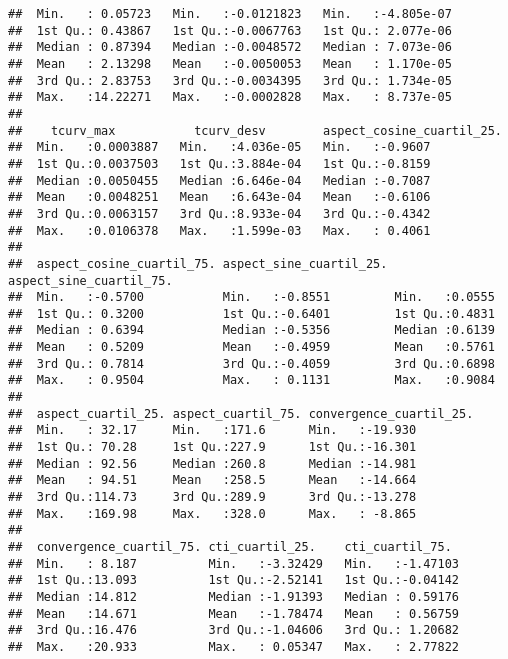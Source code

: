 \documentclass[11pt,]{article}
\begin{document}
\begin{verbatim}
##  Min.   : 0.05723   Min.   :-0.0121823   Min.   :-4.805e-07  
##  1st Qu.: 0.43867   1st Qu.:-0.0067763   1st Qu.: 2.077e-06  
##  Median : 0.87394   Median :-0.0048572   Median : 7.073e-06  
##  Mean   : 2.13298   Mean   :-0.0050053   Mean   : 1.170e-05  
##  3rd Qu.: 2.83753   3rd Qu.:-0.0034395   3rd Qu.: 1.734e-05  
##  Max.   :14.22271   Max.   :-0.0002828   Max.   : 8.737e-05  
##                                                              
##    tcurv_max           tcurv_desv        aspect_cosine_cuartil_25.
##  Min.   :0.0003887   Min.   :4.036e-05   Min.   :-0.9607          
##  1st Qu.:0.0037503   1st Qu.:3.884e-04   1st Qu.:-0.8159          
##  Median :0.0050455   Median :6.646e-04   Median :-0.7087          
##  Mean   :0.0048251   Mean   :6.643e-04   Mean   :-0.6106          
##  3rd Qu.:0.0063157   3rd Qu.:8.933e-04   3rd Qu.:-0.4342          
##  Max.   :0.0106378   Max.   :1.599e-03   Max.   : 0.4061          
##                                                                   
##  aspect_cosine_cuartil_75. aspect_sine_cuartil_25. aspect_sine_cuartil_75.
##  Min.   :-0.5700           Min.   :-0.8551         Min.   :0.0555         
##  1st Qu.: 0.3200           1st Qu.:-0.6401         1st Qu.:0.4831         
##  Median : 0.6394           Median :-0.5356         Median :0.6139         
##  Mean   : 0.5209           Mean   :-0.4959         Mean   :0.5761         
##  3rd Qu.: 0.7814           3rd Qu.:-0.4059         3rd Qu.:0.6898         
##  Max.   : 0.9504           Max.   : 0.1131         Max.   :0.9084         
##                                                                           
##  aspect_cuartil_25. aspect_cuartil_75. convergence_cuartil_25.
##  Min.   : 32.17     Min.   :171.6      Min.   :-19.930        
##  1st Qu.: 70.28     1st Qu.:227.9      1st Qu.:-16.301        
##  Median : 92.56     Median :260.8      Median :-14.981        
##  Mean   : 94.51     Mean   :258.5      Mean   :-14.664        
##  3rd Qu.:114.73     3rd Qu.:289.9      3rd Qu.:-13.278        
##  Max.   :169.98     Max.   :328.0      Max.   : -8.865        
##                                                               
##  convergence_cuartil_75. cti_cuartil_25.    cti_cuartil_75.   
##  Min.   : 8.187          Min.   :-3.32429   Min.   :-1.47103  
##  1st Qu.:13.093          1st Qu.:-2.52141   1st Qu.:-0.04142  
##  Median :14.812          Median :-1.91393   Median : 0.59176  
##  Mean   :14.671          Mean   :-1.78474   Mean   : 0.56759  
##  3rd Qu.:16.476          3rd Qu.:-1.04606   3rd Qu.: 1.20682  
##  Max.   :20.933          Max.   : 0.05347   Max.   : 2.77822  

\end{verbatim}
\end{document}
